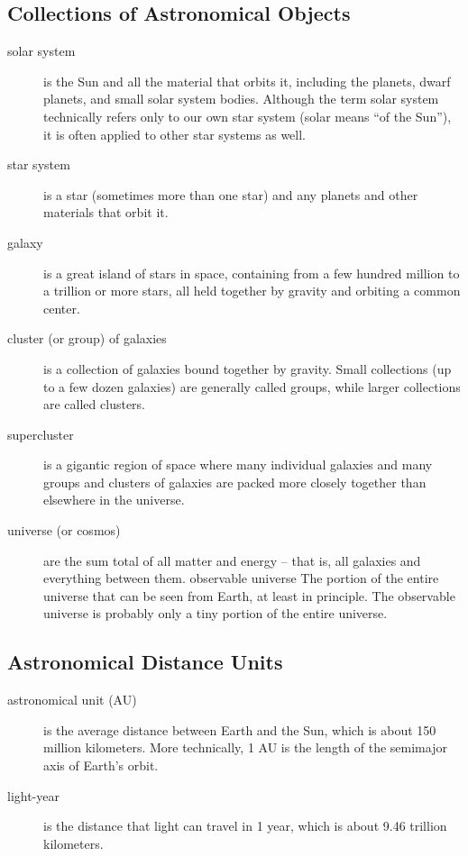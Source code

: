 \documentclass[12pt]{article}
\begin{document}
\subsection{Collections of Astronomical Objects}
\begin{description}
\item[solar system] is the Sun and all the material that orbits it, including the planets, dwarf planets, and small solar system bodies. Although the term solar system technically refers only to our own star system (solar means “of the Sun”), it is often applied to other star systems as well.
\item[star system] is a star (sometimes more than one star) and any planets and other materials that orbit it.
\item[galaxy] is a great island of stars in space, containing from a few hundred million to a trillion or more stars, all held together by gravity and
orbiting a common center.
\item[cluster (or group) of galaxies] is a collection of galaxies bound together by gravity. Small collections (up to a few dozen galaxies)
are generally called groups, while larger collections are called clusters.
\item[supercluster] is a gigantic region of space where many individual galaxies and many groups and clusters of galaxies are packed more
closely together than elsewhere in the universe.
\item[universe (or cosmos)] are the sum total of all matter and energy -- that is, all galaxies and everything between them.
observable universe The portion of the entire universe that can be seen from Earth, at least in principle. The observable universe is
probably only a tiny portion of the entire universe.
\end{description}

\subsection{Astronomical Distance Units}
\begin{description}
\item[astronomical unit (AU)] is the average distance between Earth and the Sun, which is about 150 million kilometers. More technically,
1 AU is the length of the semimajor axis of Earth’s orbit.
\item[light-year] is the distance that light can travel in 1 year, which is about 9.46 trillion kilometers.
\end{description}
\end{document}
